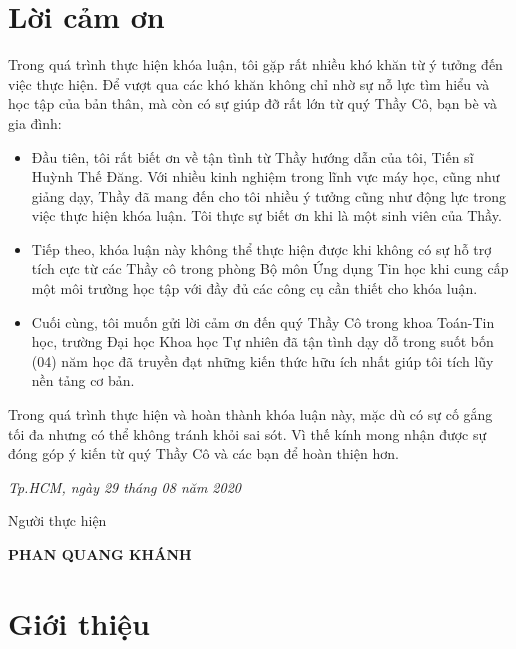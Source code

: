 \documentclass[12pt,oneside]{report}
\begin{document}
\begin{titlepage} 

\end{titlepage}
\clearpage

\clearpage
\chapter*{Lời cảm ơn}
Trong quá trình thực hiện khóa luận, tôi gặp rất nhiều khó khăn từ ý tưởng đến việc thực hiện. Để vượt qua các khó khăn không chỉ nhờ sự nỗ lực tìm hiểu và học tập của bản thân, mà còn có sự giúp đỡ rất lớn từ quý Thầy Cô, bạn bè và gia đình:
\begin{itemize}
\item Đầu tiên, tôi rất biết ơn về tận tình từ Thầy hướng dẫn của tôi, Tiến sĩ Huỳnh Thế Đăng. Với nhiều kinh nghiệm trong lĩnh vực máy học, cũng như giảng dạy, Thầy đã mang đến cho tôi nhiều ý tưởng cũng như động lực trong việc thực hiện khóa luận. Tôi thực sự biết ơn khi là một sinh viên của Thầy.
\item Tiếp theo, khóa luận này không thể thực hiện được khi không có sự hỗ trợ tích cực từ các Thầy cô trong phòng Bộ môn Ứng dụng Tin học khi cung cấp một môi trường học tập với đầy đủ các công cụ cần thiết cho khóa luận.
\item Cuối cùng, tôi muốn gửi lời cảm ơn đến quý Thầy Cô trong khoa Toán-Tin học, trường Đại học Khoa học Tự nhiên đã tận tình dạy dỗ trong suốt bốn (04) năm học đã truyền đạt những kiến thức hữu ích nhất giúp tôi tích lũy nền tảng cơ bản.
\end{itemize}
Trong quá trình thực hiện và hoàn thành khóa luận này, mặc dù có sự cố gắng tối đa nhưng có thể không tránh khỏi sai sót. Vì thế kính mong nhận được sự đóng góp ý kiến từ quý Thầy Cô và các bạn để hoàn thiện hơn.

\begin{flushright}
{\it Tp.HCM, ngày 29 tháng 08 năm 2020}

Người thực hiện\hskip 2cm\quad

{\bf PHAN QUANG KHÁNH} \hskip 0.5cm \quad\
 \end{flushright}
\clearpage
\tableofcontents
\clearpage
\listoffigures 
\clearpage
{}
\listofword\label{listofword}
\clearpage
\chapter{Giới thiệu}

\end{document}
